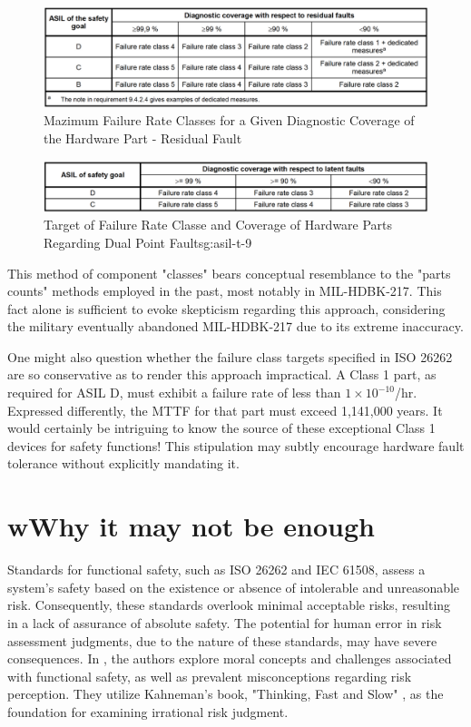 \documentclass[./dissertation.tex]{subfiles}
\begin{document}
\begin{figure}[H]
\centering
\includegraphics[width=\linewidth]{subfiles/imgs/asil-t-8.png}
\caption{Mazimum Failure Rate Classes for a Given Diagnostic Coverage of the Hardware Part - Residual Fault}
\label{fig:asil-t-8}
\end{figure}

\begin{figure}[H]
\centering
\includegraphics[width=\linewidth]{subfiles/imgs/asil-t-9.png}
\caption{Target of Failure Rate Classe and Coverage of Hardware Parts Regarding Dual Point Faultsg:asil-t-9}
\end{figure}

This method of component "classes" bears conceptual resemblance to the "parts counts" methods employed in the past, most notably in MIL-HDBK-217. This fact alone is sufficient to evoke skepticism regarding this approach, considering the military eventually abandoned MIL-HDBK-217 due to its extreme inaccuracy.

One might also question whether the failure class targets specified in ISO 26262 are so conservative as to render this approach impractical. A Class 1 part, as required for ASIL D, must exhibit a failure rate of less than $1\times10^{-10}$/hr. Expressed differently, the MTTF for that part must exceed 1,141,000 years. It would certainly be intriguing to know the source of these exceptional Class 1 devices for safety functions! This stipulation may subtly encourage hardware fault tolerance without explicitly mandating it.



\section{wWhy it may not be enough}
Standards for functional safety, such as ISO 26262 and IEC 61508, assess a system's safety based on the existence or absence of intolerable and unreasonable risk. Consequently, these standards overlook minimal acceptable risks, resulting in a lack of assurance of absolute safety. The potential for human error in risk assessment judgments, due to the nature of these standards, may have severe consequences. In \cite{7958474}, the authors explore moral concepts and challenges associated with functional safety, as well as prevalent misconceptions regarding risk perception. They utilize Kahneman's book, "Thinking, Fast and Slow" \cite{daniel2017thinking}, as the foundation for examining irrational risk judgment.
\end{document}
